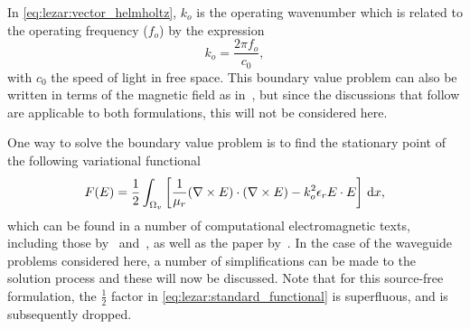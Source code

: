 In \eqref{eq:lezar:vector_helmholtz}, $k_o$ is the operating
wavenumber which is related to the
operating frequency ($f_o$) by the expression
\begin{equation}
  \label{eq:lezar:operating_wavenumber}
 k_o = \frac{2\pi f_o}{c_0},
\end{equation}
with $c_0$ the speed of light in free space.  This boundary value
problem can also be written in terms of the magnetic field as
in~\citet{Jin2002}, but since the discussions that follow are applicable
to both formulations, this will not be considered here.

One way to solve the boundary value problem is to find the stationary
point of the following variational functional
\begin{equation}
  \label{eq:lezar:standard_functional}
  F({E})
      = \frac{1}{2}\int_{\Omega_v} \left[ \frac{1}{\mu_r}(\nabla\times{\ensuremath{{E}}})\cdot(\nabla\times{\ensuremath{{E}}})
      - k_o^2\epsilon_r{E}\cdot{\ensuremath{{E}}} \right] \, \mathrm{d}x,
\end{equation}
which can be found in a number of computational electromagnetic texts,
including those by~\citet{Jin2002}
and~\citet{PelosiCoccioliSelleri1998}, as well as the paper
by~\citet{LeeSunCendes1991}. In the case of the waveguide problems
considered here, a number of simplifications can be made to the
solution process and these will now be discussed. Note that for this
source-free formulation, the $\frac{1}{2}$ factor
in \eqref{eq:lezar:standard_functional} is superfluous, and is
subsequently dropped.

